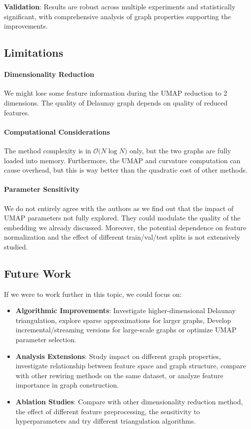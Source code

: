 \documentclass{article}
\theoremstyle{plain}
\theoremstyle{definition}
\theoremstyle{remark}
\begin{document}
\textbf{Validation}: Results are robust across multiple experiments and 
statistically significant, with comprehensive analysis of graph properties
supporting the improvements.

\subsection{Limitations}
\paragraph{Dimensionality Reduction} We might lose some feature information
during the UMAP reduction to 2 dimensions. The quality of Delaunay graph depends
 on quality of reduced features.

 \paragraph{Computational Considerations}
 The method complexity is in $\mathcal{O} \big( N \log N \big)$ only, but the 
 two graphs are  fully loaded into memory. Furthermore, the UMAP and curvature 
 computation can cause overhead, but this is way better than the quadratic cost
 of other methods.
   
\paragraph{Parameter Sensitivity} We do not entirely agree with the authors as
we find out that the impact of UMAP parameters not fully explored. They could
modulate the quality of the embedding we already discussed. Moreover, the
potential dependence on feature normalization and the effect of different
 train/val/test splits is not extensively studied.

\subsection{Future Work}
If we were to work further in this topic, we could focus on:
\begin{itemize}
    \item \textbf{Algorithmic Improvements}: Investigate higher-dimensional 
    Delaunay triangulation, explore sparse approximations for larger graphs, 
   Develop incremental/streaming versions for large-scale graphs or 
   optimize UMAP parameter selection.

    \item \textbf{Analysis Extensions}:
   Study impact on different graph properties, 
   investigate relationship between feature space and graph structure,
   compare with other rewiring methods on the same dataset,
   or analyze feature importance in graph construction.

    \item \textbf{Ablation Studies}:
   Compare with other dimensionality reduction method, the effect of different 
   feature preprocessing, the sensitivity to hyperparameters and try different
    triangulation algorithms.
\end{itemize}
\end{document}

